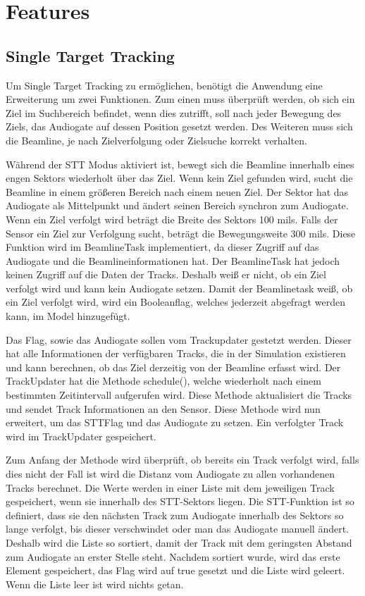 \section{Features}

\subsection{Single Target Tracking}
Um Single Target Tracking zu ermöglichen, benötigt die Anwendung eine Erweiterung um zwei Funktionen. Zum einen muss überprüft werden, ob sich ein Ziel 
im Suchbereich befindet, wenn dies zutrifft, soll nach jeder Bewegung des Ziels, das Audiogate auf dessen Position gesetzt werden. Des Weiteren muss sich 
die Beamline, je nach Zielverfolgung oder Zielsuche korrekt verhalten.

Während der STT Modus aktiviert ist, bewegt sich die Beamline innerhalb eines engen Sektors wiederholt über das Ziel. Wenn kein Ziel gefunden wird, sucht
die Beamline in einem größeren Bereich nach einem neuen Ziel. Der Sektor hat das Audiogate als Mittelpunkt und ändert seinen Bereich synchron zum 
Audiogate. Wenn ein Ziel verfolgt wird beträgt die Breite des Sektors 100 mils. Falls der Sensor ein Ziel zur Verfolgung sucht, beträgt die 
Bewegungsweite 300 mils. Diese Funktion wird im BeamlineTask implementiert, da dieser Zugriff auf das Audiogate und die Beamlineinformationen hat. Der 
BeamlineTask hat jedoch keinen Zugriff auf die Daten der Tracks. Deshalb weiß er nicht, ob ein Ziel verfolgt wird und kann kein Audiogate setzen. Damit 
der Beamlinetask weiß, ob ein Ziel verfolgt wird, wird ein Booleanflag, welches jederzeit abgefragt werden kann, im Model hinzugefügt.

Das Flag, sowie das Audiogate sollen vom Trackupdater gestetzt werden. Dieser hat alle Informationen der verfügbaren Tracks, die in der Simulation 
existieren und kann berechnen, ob das Ziel derzeitig von der Beamline erfasst wird. Der TrackUpdater hat die Methode schedule(), welche wiederholt nach 
einem bestimmten Zeitintervall aufgerufen wird. Diese Methode aktualisiert die Tracks und sendet Track Informationen an den Sensor. Diese Methode wird 
nun erweitert, um das STTFlag und das Audiogate zu setzen. Ein verfolgter Track wird im TrackUpdater gespeichert.

Zum Anfang der Methode wird überprüft, ob bereits ein Track verfolgt wird, falls dies nicht der Fall ist wird die Distanz vom Audiogate zu allen 
vorhandenen Tracks berechnet. Die Werte werden in einer Liste mit dem jeweiligen Track gespeichert, wenn sie innerhalb des STT-Sektors liegen. Die 
STT-Funktion ist so definiert, dass sie den nächsten Track zum Audiogate innerhalb des Sektors so lange verfolgt, bis dieser verschwindet oder man das 
Audiogate manuell ändert. Deshalb wird die Liste so sortiert, damit der Track mit dem geringsten Abstand zum Audiogate an erster Stelle steht. Nachdem 
sortiert wurde, wird das erste Element gespeichert, das Flag wird auf true gesetzt und die Liste wird geleert. Wenn die Liste leer ist wird nichts getan. 

